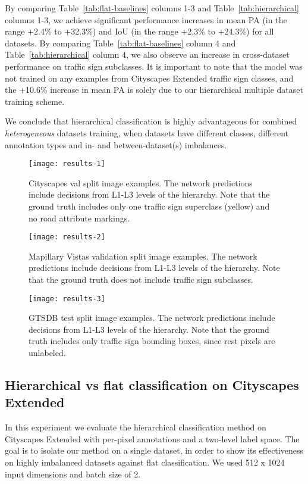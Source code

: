 \documentclass[letterpaper, 10 pt, conference]{ieeeconf}
\begin{document}
By comparing Table~\ref{tab:flat-baselines} columns 1-3 and Table~\ref{tab:hierarchical} columns 1-3, we achieve significant performance increases in mean PA (in the range +2.4\% to +32.3\%) and IoU (in the range +2.3\% to +24.3\%) for all datasets. By comparing Table~\ref{tab:flat-baselines} column 4 and Table~\ref{tab:hierarchical} column 4, we also observe an increase in cross-dataset performance on traffic sign subclasses. It is important to note that the model was not trained on any examples from Cityscapes Extended traffic sign classes, and the +10.6\% increase in mean PA is solely due to our hierarchical multiple dataset training scheme.

We conclude that hierarchical classification is highly advantageous for combined \textit{heterogeneous} datasets training, when datasets have different classes, different annotation types and in- and between-dataset(s) imbalances.

\begin{figure}
	\centering
	\texttt{[image: results-1]}
	\caption{Cityscapes val split image examples. The network predictions include decisions from L1-L3 levels of the hierarchy. Note that the ground truth includes only one traffic sign superclass (yellow) and no road attribute markings.}
	\label{fig:results-cityscapes}
\end{figure}

\begin{figure}
	\centering
	\texttt{[image: results-2]}
	\caption{Mapillary Vistas validation split image examples. The network predictions include decisions from L1-L3 levels of the hierarchy. Note that the ground truth does not include traffic sign subclasses.}
	\label{fig:results-vistas}
\end{figure}

\begin{figure}
	\centering
	\texttt{[image: results-3]}
	\caption{GTSDB test split image examples. The network predictions include decisions from L1-L3 levels of the hierarchy. Note that the ground truth includes only traffic sign bounding boxes, since rest pixels are unlabeled.}
	\label{fig:results-gtsdb}
\end{figure}

\subsection{Hierarchical vs flat classification on Cityscapes Extended}
\label{subsec:hierarchical-vs-flat}
In this experiment we evaluate the hierarchical classification method on Cityscapes Extended with per-pixel annotations and a two-level label space. The goal is to isolate our method on a single dataset, in order to show its effectiveness on highly imbalanced datasets against flat classification. We used 512 x 1024 input dimensions and batch size of 2.
\end{document}
